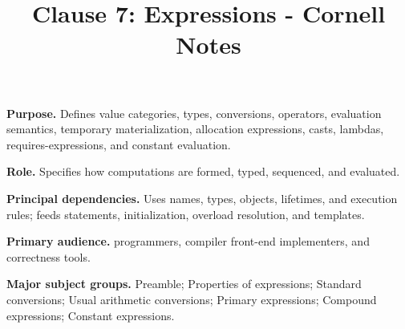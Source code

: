\documentclass[11pt,letterpaper]{article}
\title{Clause 7: Expressions - Cornell Notes}
\author{}
\date{}
\begin{document}
\maketitle
\begin{CornellReferenceOrientationBox}
\textbf{Purpose.} Defines value categories, types, conversions, operators, evaluation semantics, temporary materialization, allocation expressions, casts, lambdas, requires-expressions, and constant evaluation.
\par\textbf{Role.} Specifies how computations are formed, typed, sequenced, and evaluated.
\par\textbf{Principal dependencies.} Uses names, types, objects, lifetimes, and execution rules; feeds statements, initialization, overload resolution, and templates.
\par\textbf{Primary audience.} programmers, compiler front-end implementers, and correctness tools.
\par\textbf{Major subject groups.} Preamble; Properties of expressions; Standard conversions; Usual arithmetic conversions; Primary expressions; Compound expressions; Constant expressions.
\end{CornellReferenceOrientationBox}
\end{document}
